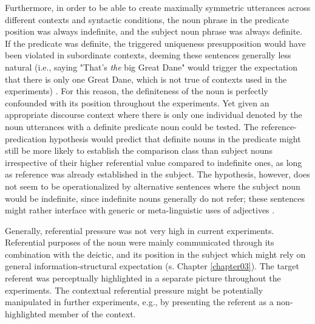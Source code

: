 Furthermore, in order to be able to create maximally symmetric utterances across different contexts and syntactic conditions, the noun phrase in the predicate position was always indefinite, and the subject noun phrase was always definite. If the predicate was definite, the triggered uniqueness presupposition would have been violated in subordinate contexts, deeming these sentences generally less natural (i.e., saying "That's \emph{the} big Great Dane" would trigger the expectation that there is only one Great Dane, which is not true of contexts used in the experiments) \parencite[cf.][]{syrett2010meaning}. 
For this reason, the definiteness of the noun is perfectly confounded with its position throughout the experiments. Yet given an appropriate discourse context where there is only one individual denoted by the noun utterances with a definite predicate noun could be tested. The reference-predication hypothesis would predict that definite nouns in the predicate might still be more likely to establish the comparison class than subject nouns irrespective of their higher referential value compared to indefinite ones, as long as reference was already established in the subject. 
The hypothesis, however, does not seem to be operationalized by alternative sentences where the subject noun would be indefinite, since indefinite nouns generally do not refer; these sentences might rather interface with generic or meta-linguistic uses of adjectives \parencite{Reboul2001, tessler2019language, barker2002dynamics}. 

Generally, referential pressure was not very high in current experiments. Referential purposes of the noun were mainly communicated through its combination with the deictic, and its position in the subject which might rely on general information-structural expectation (s. Chapter \ref{chapter03}). The target referent was perceptually highlighted in a separate picture throughout the experiments. The contextual referential pressure might be potentially manipulated in further experiments, e.g., by presenting the referent as a non-highlighted member of the context. 

